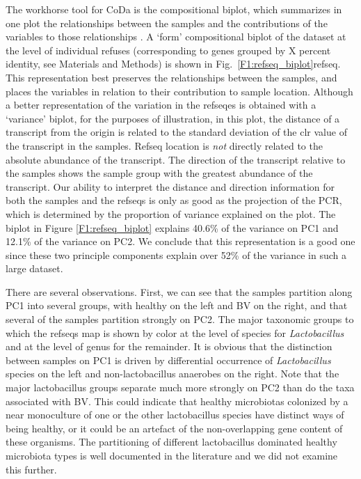 \documentclass[10pt,letterpaper]{article}
\begin{document}
The workhorse tool for CoDa is the compositional biplot, which summarizes in one plot the relationships between the samples and the contributions of the variables to those relationships \cite{aitchison2002biplots}. A `form' compositional biplot of the dataset at the level of individual refuses (corresponding to genes grouped by X percent identity, see Materials and Methods) is shown in Fig.~\ref{F1:refseq_biplot}refseq. This representation best preserves the relationships between the samples, and places the variables in relation to their contribution to sample location. Although a better representation of the variation in the refseqes is obtained with a `variance' biplot, for the purposes of illustration, in this plot, the distance of a transcript from the origin is  related to the standard deviation of the clr value of the transcript in the samples. Refseq location is \emph{not} directly related to the absolute abundance of the transcript. The direction of the transcript relative to the samples shows the sample group with the greatest abundance of the transcript. Our ability to interpret the distance and direction information for both the samples and the refseqs is only as good as the projection of the PCR, which is determined by the proportion of variance explained on the plot. The biplot in Figure \ref{F1:refseq_biplot} explains 40.6\% of the variance on PC1 and 12.1\% of the variance on PC2. We conclude that this representation is a good one since these two principle components explain over 52\% of the variance in such a large dataset.

There are several observations. First, we can see that the samples partition along PC1 into several groups, with healthy on the left and BV on the right, and that several of the samples partition strongly on PC2. The major taxonomic groups to which the refseqs map is shown by color at the level of species for \emph{Lactobacillus} and at the level of genus for the remainder. It is obvious that the distinction between samples on  PC1 is driven by differential occurrence of \emph{Lactobacillus} species on the left and non-lactobacillus anaerobes on the right. Note that the major lactobacillus groups separate much more strongly on PC2 than do the taxa associated with BV. This could indicate that healthy microbiotas colonized by a near monoculture of one or the other lactobacillus species have distinct ways of being healthy, or it could be an artefact of the non-overlapping gene content of these organisms. The partitioning of different lactobacillus dominated healthy microbiota types is well documented in the literature \cite{Ravel:2010, Hummelen:2010,mcmillan:2015}   and we did not examine this further. 
\end{document}
